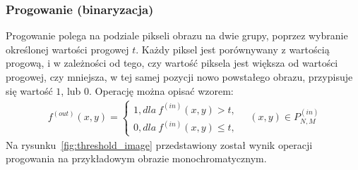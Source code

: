 \subsubsection{Progowanie (binaryzacja)} \label{sssec:threshold}
Progowanie polega na podziale pikseli obrazu na dwie grupy, poprzez wybranie określonej wartości progowej $t$. Każdy piksel jest porównywany z wartością progową, i w zależności od tego, czy wartość piksela jest większa od wartości progowej, czy mniejsza, w tej samej pozycji nowo powstałego obrazu, przypisuje się wartość $1$, lub $0$. Operację można opisać wzorem:
\begin{gather*}
  f^{(out)}(x, y) = \left\{\begin{matrix}
  1, dla \: f^{(in)}(x, y) > t,\\
  0, dla \: f^{(in)}(x, y) \leq t,
  \end{matrix}\right. \quad (x, y) \in P^{(in)}_{N,M}
\end{gather*}
Na rysunku~\ref{fig:threshold_image} przedstawiony został wynik operacji progowania na przykładowym obrazie monochromatycznym.
